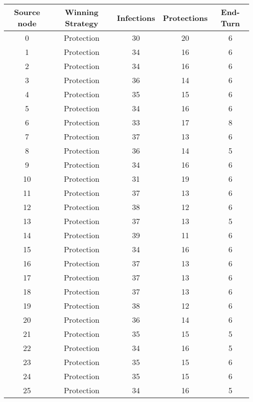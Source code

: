 \documentclass[results.tex]{subfiles}
\begin{document}
\begin{center}
  \begin{tabular}{| c || c | c | c | c |}
    \hline
    {\bfseries Source node} & {\bfseries Winning Strategy} & {\bfseries Infections} & {\bfseries Protections} & {\bfseries End-Turn} \\  %
    \hline\hline
    0 & Protection & 30 & 20 & 6 \\ 
    \hline
    1 & Protection & 34 & 16 & 6 \\ 
    \hline
    2 & Protection & 34 & 16 & 6 \\ 
    \hline
    3 & Protection & 36 & 14 & 6 \\ 
    \hline
    4 & Protection & 35 & 15 & 6 \\ 
    \hline
    5 & Protection & 34 & 16 & 6 \\ 
    \hline
    6 & Protection & 33 & 17 & 8 \\ 
    \hline
    7 & Protection & 37 & 13 & 6 \\ 
    \hline
    8 & Protection & 36 & 14 & 5 \\ 
    \hline
    9 & Protection & 34 & 16 & 6 \\ 
    \hline
    10 & Protection & 31 & 19 & 6 \\ 
    \hline
    11 & Protection & 37 & 13 & 6 \\ 
    \hline
    12 & Protection & 38 & 12 & 6 \\ 
    \hline
    13 & Protection & 37 & 13 & 5 \\ 
    \hline
    14 & Protection & 39 & 11 & 6 \\ 
    \hline
    15 & Protection & 34 & 16 & 6 \\ 
    \hline
    16 & Protection & 37 & 13 & 6 \\ 
    \hline
    17 & Protection & 37 & 13 & 6 \\ 
    \hline
    18 & Protection & 37 & 13 & 6 \\ 
    \hline
    19 & Protection & 38 & 12 & 6 \\ 
    \hline
    20 & Protection & 36 & 14 & 6 \\ 
    \hline
    21 & Protection & 35 & 15 & 5 \\ 
    \hline
    22 & Protection & 34 & 16 & 5 \\ 
    \hline
    23 & Protection & 35 & 15 & 6 \\ 
    \hline
    24 & Protection & 35 & 15 & 6 \\ 
    \hline
    25 & Protection & 34 & 16 & 5 \\ 

\end{tabular}
\end{center}
\end{document}
